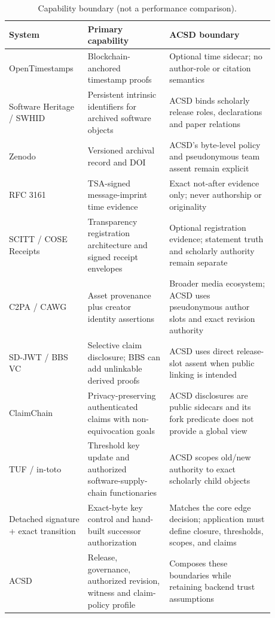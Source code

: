\documentclass[11pt]{article}
\begin{document}
\begin{table}[H]
\centering
\caption{Capability boundary (not a performance comparison).}
\begin{tabular}{p{0.23\linewidth}p{0.29\linewidth}p{0.36\linewidth}}
\toprule
System & Primary capability & ACSD boundary \\
\midrule
OpenTimestamps & Blockchain-anchored timestamp proofs & Optional time sidecar; no author-role or citation semantics \\
Software Heritage / SWHID & Persistent intrinsic identifiers for archived software objects & ACSD binds scholarly release roles, declarations and paper relations \\
Zenodo & Versioned archival record and DOI & ACSD's byte-level policy and pseudonymous team assent remain explicit \\
RFC 3161 & TSA-signed message-imprint time evidence & Exact not-after evidence only; never authorship or originality \\
SCITT / COSE Receipts & Transparency registration architecture and signed receipt envelopes & Optional registration evidence; statement truth and scholarly authority remain separate \\
C2PA / CAWG & Asset provenance plus creator identity assertions & Broader media ecosystem; ACSD uses pseudonymous author slots and exact revision authority \\
SD-JWT / BBS VC & Selective claim disclosure; BBS can add unlinkable derived proofs & ACSD uses direct release-slot assent when public linking is intended \\
ClaimChain & Privacy-preserving authenticated claims with non-equivocation goals & ACSD disclosures are public sidecars and its fork predicate does not provide a global view \\
TUF / in-toto & Threshold key update and authorized software-supply-chain functionaries & ACSD scopes old/new authority to exact scholarly child objects \\
Detached signature + exact transition & Exact-byte key control and hand-built successor authorization & Matches the core edge decision; application must define closure, thresholds, scopes, and claims \\
ACSD & Release, governance, authorized revision, witness and claim-policy profile & Composes these boundaries while retaining backend trust assumptions \\
\bottomrule
\end{tabular}
\end{table}
\end{document}
